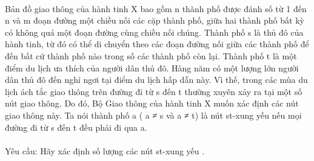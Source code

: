  

Bản đồ giao thông của hành tinh X bao gồm n thành phố được đánh số từ 1 đến n và m đoạn đường một chiều nối các cặp thành phố, giữa hai thành phố bất kỳ có không quá một đoạn đường cùng chiều nối chúng. Thành phố s là thủ đô của hành tinh, từ đó có thể di chuyển theo các đoạn đường nối giữa các thành phố để đến bất cứ thành phố nào trong số các thành phố còn lại. Thành phố t là một điểm du lịch ưa thích của người dân thủ đô. Hàng năm có một lượng lớn người dân thủ đô đến nghỉ ngơi tại điểm du lịch hấp dẫn này. Vì thế, trong các mùa du lịch ách tắc giao thông trên đường đi từ s đến t thường xuyên xảy ra tại một số nút giao thông. Do đó, Bộ Giao thông của hành tinh X muốn xác định các nút giao thông này. Ta nói thành phố a ( a ≠ s và a ≠ t) là nút st-xung yếu nếu mọi đường đi từ s đến t đều phải đi qua a.
\\
\\Yêu cầu: Hãy xác định số lượng các nút st-xung yếu .